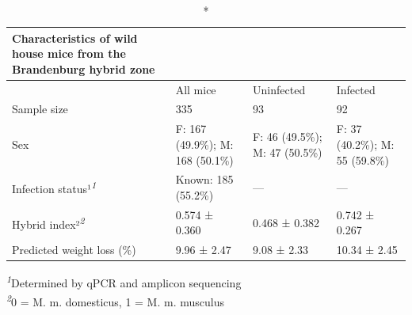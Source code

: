\newlength\holdLTleft\newlength\holdLTright\setlength\holdLTleft{\LTleft}\relax\setlength\holdLTright{\LTright}\relax\setlength{}
\setlength{}\setlength{\LTpost}{0mm}
\begin{longtable}{@{\extracolsep{\fill}}llll}
\caption*{
{\large Characteristics of wild house mice from the Brandenburg hybrid zone}
} \\ 
\toprule
 & All mice & Uninfected & Infected \\ 
\midrule\addlinespace[2.5pt]
Sample size & 335 & 93 & 92 \\ 
Sex & F: 167 (49.9\%); M: 168 (50.1\%) & F: 46 (49.5\%); M: 47 (50.5\%) & F: 37 (40.2\%); M: 55 (59.8\%) \\ 
Infection status¹\textsuperscript{\textit{1}} & Known: 185 (55.2\%) & — & — \\ 
Hybrid index²\textsuperscript{\textit{2}} & 0.574 ± 0.360 & 0.468 ± 0.382 & 0.742 ± 0.267 \\ 
Predicted weight loss (\%) & 9.96 ± 2.47 & 9.08 ± 2.33 & 10.34 ± 2.45 \\ 
\bottomrule
\end{longtable}
\begin{minipage}{\linewidth}
\textsuperscript{\textit{1}}Determined by qPCR and amplicon sequencing\\
\textsuperscript{\textit{2}}0 = M. m. domesticus, 1 = M. m. musculus\\
\end{minipage}
\setlength\LTleft{\holdLTleft}
\setlength\LTright{\holdLTright}

